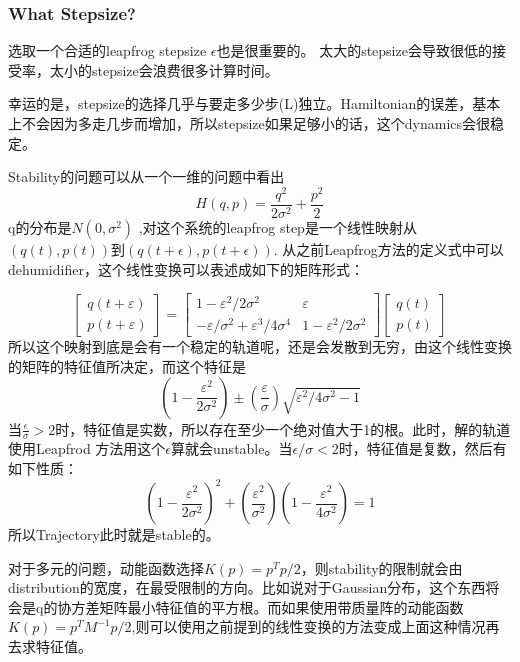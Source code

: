 \documentclass[
]{book}
\theoremstyle{definition}
\theoremstyle{definition}
\theoremstyle{definition}
\theoremstyle{remark}
\begin{document}
\hypertarget{what-stepsize}{%
\subsubsection{What Stepsize?}\label{what-stepsize}}

选取一个合适的leapfrog stepsize \(\epsilon\)也是很重要的。 太大的stepsize会导致很低的接受率，太小的stepsize会浪费很多计算时间。

幸运的是，stepsize的选择几乎与要走多少步(L)独立。Hamiltonian的误差，基本上不会因为多走几步而增加，所以stepsize如果足够小的话，这个dynamics会很稳定。

Stability的问题可以从一个一维的问题中看出
\[
H(q, p)=\frac{q^{2}}{2 \sigma^{2}}+\frac{p^{2}}{2}
\]
q的分布是\(N(0,\sigma^2)\) ,对这个系统的leapfrog step是一个线性映射从\((q(t),p(t))\)到\((q(t+\epsilon),p(t+\epsilon))\). 从之前Leapfrog方法的定义式中可以dehumidifier，这个线性变换可以表述成如下的矩阵形式：

\[
\left[ \begin{array}{c}{q(t+\varepsilon)} \\ {p(t+\varepsilon)}\end{array}\right]=\left[ \begin{array}{cc}{1-\varepsilon^{2} / 2 \sigma^{2}} & {\varepsilon} \\ {-\varepsilon / \sigma^{2}+\varepsilon^{3} / 4 \sigma^{4}} & {1-\varepsilon^{2} / 2 \sigma^{2}}\end{array}\right] \left[ \begin{array}{l}{q(t)} \\ {p(t)}\end{array}\right]
\]
所以这个映射到底是会有一个稳定的轨道呢，还是会发散到无穷，由这个线性变换的矩阵的特征值所决定，而这个特征是
\[
\left(1-\frac{\varepsilon^{2}}{2 \sigma^{2}}\right) \pm\left(\frac{\varepsilon}{\sigma}\right) \sqrt{\varepsilon^{2} / 4 \sigma^{2}-1}
\]
当\(\frac{\epsilon}{\sigma}>2\)时，特征值是实数，所以存在至少一个绝对值大于1的根。此时，解的轨道使用Leapfrod 方法用这个\(\epsilon\)算就会unstable。当\(\epsilon/\sigma<2\)时，特征值是复数，然后有如下性质：
\[
\left(1-\frac{\varepsilon^{2}}{2 \sigma^{2}}\right)^{2}+\left(\frac{\varepsilon^{2}}{\sigma^{2}}\right)\left(1-\frac{\varepsilon^{2}}{4 \sigma^{2}}\right)=1
\]
所以Trajectory此时就是stable的。

对于多元的问题，动能函数选择\(K(p)=p^Tp/2\)，则stability的限制就会由distribution的宽度，在最受限制的方向。比如说对于Gaussian分布，这个东西将会是q的协方差矩阵最小特征值的平方根。而如果使用带质量阵的动能函数\(K(p)=p^{T} M^{-1} p / 2\),则可以使用之前提到的线性变换的方法变成上面这种情况再去求特征值。
\end{document}
